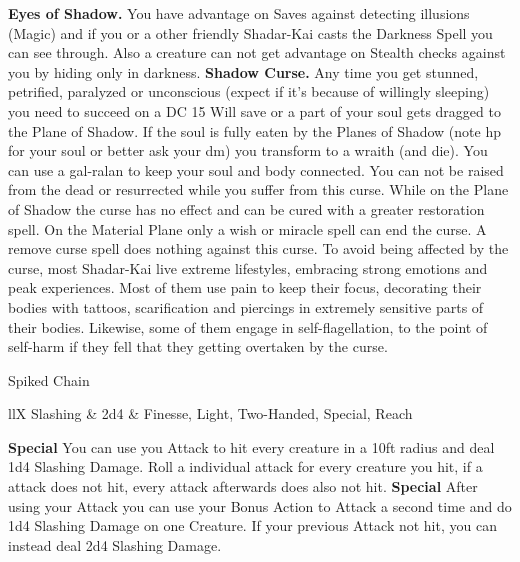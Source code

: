 \documentclass[a4paper,10pt,twoside,twocolumn]{dndbook} %
\begin{document}
	\textbf{Eyes of Shadow.} You have advantage on Saves against detecting illusions (Magic) and if you or a other friendly Shadar-Kai casts the Darkness Spell you can see through. Also a creature can not get advantage on Stealth checks against you by hiding only in darkness.
	\textbf{Shadow Curse.} Any time you get stunned, petrified, paralyzed or unconscious (expect if it's because of willingly sleeping) you need to succeed on a DC 15 Will save or a part of your soul gets dragged to the Plane of Shadow. If the soul is fully eaten by the Planes of Shadow (note hp for your soul or better ask your dm) you transform to a wraith (and die). You can use a gal-ralan to keep your soul and body connected. You can not be raised from the dead or resurrected while you suffer from this curse. While on the Plane of Shadow the curse has no effect and can be cured with a greater restoration spell. On the Material Plane only a wish or miracle spell can end the curse. A remove curse spell does nothing against this curse.\linebreak
	To avoid being affected by the curse, most Shadar-Kai live extreme lifestyles, embracing strong emotions and peak experiences. Most of them use pain to keep their focus, decorating their bodies with tattoos, scarification and piercings in extremely sensitive parts of their bodies. Likewise, some of them engage in self-flagellation, to the point of self-harm if they fell that they getting overtaken by the curse.
	\begin{DndSidebar}{Spiked Chain}
		\begin{DndTable}{llX}
			Slashing & 2d4 & Finesse, Light, Two-Handed, Special, Reach
		\end{DndTable}
		\textbf{Special} You can use you Attack to hit every creature in a 10ft radius and deal 1d4 Slashing Damage. Roll a individual attack for every creature you hit, if a attack does not hit, every attack afterwards does also not hit.\linebreak
		\textbf{Special} After using your Attack you can use your Bonus Action to Attack a second time and do 1d4 Slashing Damage on one Creature. If your previous Attack not hit, you can instead deal 2d4 Slashing Damage.
	\end{DndSidebar}
	
	
\end{document}
